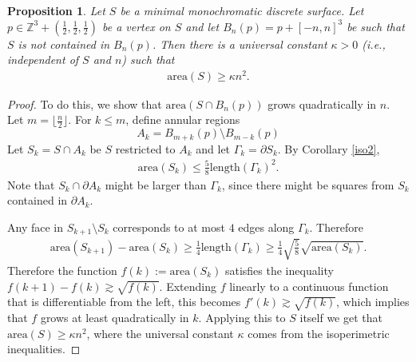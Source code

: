 \documentclass[11pt]{article}
\newtheorem{prop}[thm]{Proposition}
\theoremstyle{remark}
\theoremstyle{definition}
\newcommand{\m}[1]{\mathbb{#1}}
\begin{document}
\begin{prop}\label{prop:quadratic growth}
	Let $S$ be a minimal monochromatic discrete surface. Let $p\in \m Z^3 + (\frac{1}{2},\frac{1}{2},\frac{1}{2})$ be a vertex on $S$ and let $B_n(p) = p + [-n,n]^3$ be such that $S$ is not contained in $B_n(p)$. Then there is a universal constant $\kappa>0$ (i.e., independent of $S$ and $n$) such that 
	\begin{align*}
	\text{area}(S) \geq \kappa n^2.
	\end{align*}
\end{prop}
\begin{proof}
    To do this, we show that $\text{area}(S\cap B_n(p))$ grows quadratically in $n$. Let $m = \lfloor{\frac{n}{2}}\rfloor$. For $k\leq m$, define annular regions
    $$A_k = B_{m+k}(p)\setminus B_{m-k}(p)$$
    Let $S_k = S\cap A_k$ be $S$ restricted to $A_k$ and let $\Gamma_k=\partial S_k$. By Corollary \ref{iso2}, 
    \begin{align*}
        \text{area}(S_k) \leq \frac{5}{8} \text{length}(\Gamma_k)^2.
    \end{align*}
    Note that $S_k\cap \partial A_k$ might be larger than $\Gamma_k$, since there might be squares from $S_k$ contained in $\partial A_k$. 

    Any face in $S_{k+1}\setminus S_k$ corresponds to at most $4$ edges along $\Gamma_k$. Therefore 
    \begin{align*}
        \text{area}(S_{k+1})-\text{area}(S_k) \geq \frac{1}{4} \text{length}(\Gamma_k) \geq \frac{1}{4}\sqrt{\frac{5}{8}} \sqrt{\text{area}(S_k)}.
    \end{align*}
    Therefore the function $f(k):=\text{area}(S_k)$ satisfies the inequality $f(k+1)-f(k)\apprge \sqrt{f(k)}$. Extending $f$ linearly to a continuous function that is differentiable from the left, this becomes $f'(k) \apprge \sqrt{f(k)}$, which implies that $f$ grows at least quadratically in $k$. Applying this to $S$ itself we get that $\text{area}(S) \geq \kappa n^2$, where the universal constant $\kappa$ comes from the isoperimetric inequalities. 
\end{proof}
\end{document}
